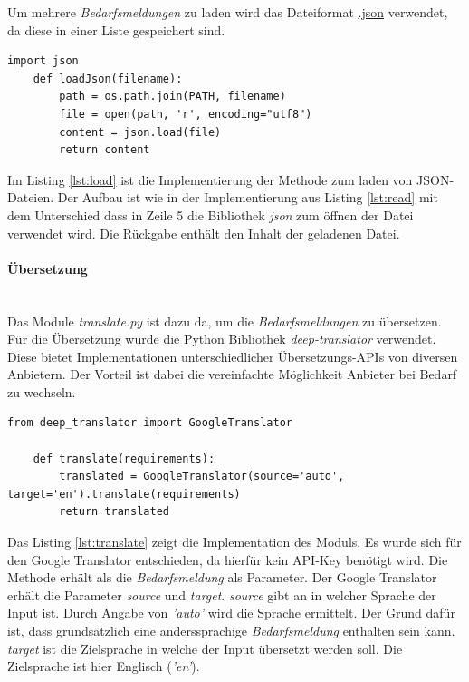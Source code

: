 Um mehrere \emph{Bedarfsmeldungen} zu laden wird das Dateiformat \url{.json} verwendet, da diese in einer Liste gespeichert sind.
\begin{lstlisting}[caption={Implementation der Methode loadJson() des Moduls \emph{readRequirements.py}}, label=lst:load]
	import json
	def loadJson(filename):
		path = os.path.join(PATH, filename)
		file = open(path, 'r', encoding="utf8")
		content = json.load(file)
		return content
\end{lstlisting}
Im Listing \ref{lst:load} ist die Implementierung der Methode zum laden von JSON-Dateien. Der Aufbau ist wie in der Implementierung aus Listing \ref{lst:read} mit dem Unterschied dass in Zeile 5 die Bibliothek \emph{json} zum öffnen der Datei verwendet wird. Die Rückgabe enthält den Inhalt der geladenen Datei.
\paragraph{Übersetzung}\mbox{}\\
Das Module \emph{translate.py} ist dazu da, um die \emph{Bedarfsmeldungen} zu übersetzen. Für die Übersetzung wurde die Python Bibliothek \emph{deep-translator} verwendet. Diese bietet Implementationen unterschiedlicher Übersetzungs-APIs von diversen Anbietern. Der Vorteil ist dabei die vereinfachte Möglichkeit Anbieter bei Bedarf zu wechseln.
\begin{lstlisting}[caption={Implementation des Moduls \emph{translate.py}}, label=lst:translate]
	from deep_translator import GoogleTranslator
	
	def translate(requirements):
		translated = GoogleTranslator(source='auto', target='en').translate(requirements)
		return translated
\end{lstlisting}
Das Listing \ref{lst:translate} zeigt die Implementation des Moduls. Es wurde sich für den Google Translator entschieden, da hierfür kein API-Key benötigt wird. Die Methode erhält als die \emph{Bedarfsmeldung} als Parameter. Der Google Translator erhält die Parameter \emph{source} und \emph{target}. \emph{source} gibt an in welcher Sprache der Input ist. Durch Angabe von \emph{'auto'} wird die Sprache ermittelt. Der Grund dafür ist, dass grundsätzlich eine anderssprachige \emph{Bedarfsmeldung} enthalten sein kann. \emph{target} ist die Zielsprache in welche der Input übersetzt werden soll. Die Zielsprache ist hier Englisch (\emph{'en'}).
